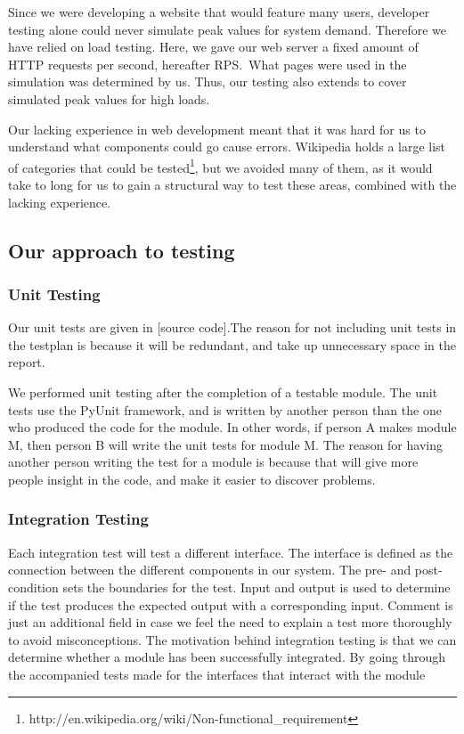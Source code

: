 Since we were developing a website that would feature many users,
developer testing alone could never simulate peak values for system
demand. Therefore we have relied on load testing. Here, we gave our web
server a fixed amount of HTTP requests per second, hereafter RPS.\ What
pages were used in the simulation was determined by us. Thus, our
testing also extends to cover simulated peak values for high loads.


Our lacking experience in web development meant that it was hard for us
to understand what components could go cause errors. Wikipedia holds a
large list of categories that could be
tested\footnote{http://en.wikipedia.org/wiki/Non-functional\_requirement},
but we avoided many of them, as it would take to long for us to gain a
structural way to test these areas, combined with the lacking
experience. 

\subsection{Our approach to testing}
\subsubsection{Unit Testing}
Our unit tests are given in [source code].The reason for not including
unit tests in the testplan is because it will be redundant, and take up
unnecessary space in the report.

We performed unit testing after the completion of a testable module. The
unit tests use the PyUnit framework, and is written by another person
than the one who produced the code for the module. In other words, if
person A makes module M, then person B will write the unit tests for
module M. The reason for having another person writing the test for a
module is because that will give more people insight in the code, and
make it easier to discover problems.

\subsubsection{Integration Testing}
Each integration test will test a different interface. The interface is
defined as the connection between the different components in our
system. The pre- and post-condition sets the boundaries for the test.
Input and output is used to determine if the test produces the expected
output with a corresponding input. Comment is just an additional field
in case we feel the need to explain a test more thoroughly to avoid
misconceptions. The motivation behind integration testing is that we
can determine whether a module has been successfully integrated. By
going through the accompanied tests made for the interfaces that
interact with the module


